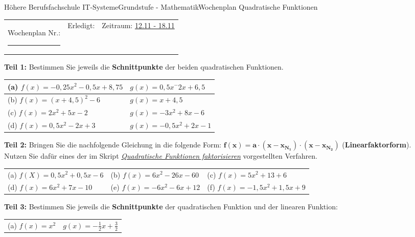 \documentclass[oneside,openany,headings=optiontotoc,11pt,numbers=noenddot]{scrreprt}
\begin{document}
	\begin{worksheet}{Höhere Berufsfachschule IT-Systeme}{Grundstufe - Mathematik}{Wochenplan Quadratische Funktionen}
		\noindent
		\begin{tabularx}{\textwidth}{XXl}
			Wochenplan Nr.: \rule{0.15\textwidth}{1pt} & Erledigt: & Zeitraum: \underline{12.11 - 18.11}
		\end{tabularx}
	
		\begin{framed}
			\noindent
			\textbf{Teil 1:} Bestimmen Sie jeweils die \textbf{Schnittpunkte} der beiden quadratischen Funktionen.\\
			\par\noindent
			\begin{tabularx}{\textwidth}{XX}
				(a) \(f(x) = -0,25x^2-0,5x+8,75\) & \(g(x) = 0,5x^- 2x +6,5\)\\
				\hline
				(b) \(f(x) = (x+4,5)^2 -6\) & \(g(x) = x+4,5\)\\
				\hline
				(c) \(f(x) = 2x^2+5x-2\) & \(g(x) = -3x^2+8x-6\)\\
				\hline
				(d) \(f(x) = 0,5x^2-2x+3\) & \(g(x) = -0,5x^2+2x-1\)
			\end{tabularx}
		\end{framed}
		\begin{framed}
			\noindent
			\textbf{Teil 2:} Bringen Sie die nachfolgende Gleichung in die folgende Form: \(\mathbf{f(x) = a\cdot{}(x-x_{N_1})\cdot(x-x_{N_2})}\) (\textbf{Linearfaktorform}).\\
			Nutzen Sie dafür eines der im Skript \textit{\underline{Quadratische Funktionen faktorisieren}} vorgestellten Verfahren.\\
			\par\noindent
			\begin{tabularx}{\textwidth}{XXX}
				(a) \( f(X) = 0,5x^2+0,5x-6\) & (b) \(f(x) = 6x^2-26x-60\) & (c) \(f(x) = 5x^2+13+6\)\\
				(d) \(f(x) = 6x^2+7x-10\) & (e) \(f(x) = -6x^2 -6x +12\) & (f) \(f(x) = -1,5x^2+1,5x+9\)
			\end{tabularx}
		\end{framed}
		\begin{framed}
			\noindent
			\textbf{Teil 3:} Bestimmen Sie jeweils die \textbf{Schnittpunkte} der quadratischen Funktion und der linearen Funktion:\\
			\par\noindent
			\begin{tabularx}{\textwidth}{XX}
				(a) \(f(x) = x^2\) & \(g(x) = -\frac{1}{2}x + \frac{3}{2}\)\\

\end{tabularx}
\end{framed}
\end{worksheet}
\end{document}
